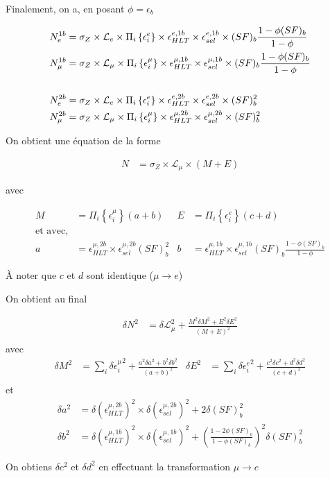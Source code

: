 \documentclass[a4paper,11pt]{article}
\begin{document}
Finalement, on a, en posant $\phi = \epsilon_b$

\begin{align}
  N_e^{1b} &= \sigma_Z \times \mathcal{L}_e \times \Pi_i \left\{ \epsilon_i^{e} \right\} \times \epsilon_{HLT}^{e, 1b} \times \epsilon_{sel}^{e, 1b} \times (SF)_b\frac{1 - \phi (SF)_b}{1 - \phi} \\
  N_\mu^{1b} &= \sigma_Z \times \mathcal{L}_\mu \times \Pi_i \left\{ \epsilon_i^{\mu} \right\} \times \epsilon_{HLT}^{\mu, 1b} \times \epsilon_{sel}^{\mu, 1b} \times (SF)_b\frac{1 - \phi (SF)_b}{1 - \phi} \\
  \notag \\
  N_e^{2b} &= \sigma_Z \times \mathcal{L}_e \times \Pi_i \left\{ \epsilon_i^{e} \right\} \times \epsilon_{HLT}^{e, 2b} \times \epsilon_{sel}^{e, 2b} \times (SF)_b^2 \\
  N_\mu^{2b} &= \sigma_Z \times \mathcal{L}_\mu \times \Pi_i \left\{ \epsilon_i^{\mu} \right\} \times \epsilon_{HLT}^{\mu, 2b} \times \epsilon_{sel}^{\mu, 2b} \times (SF)_b^2
\end{align}

On obtient une équation de la forme

\begin{align}
  N &= \sigma_Z \times \mathcal{L}_\mu \times \left( M + E \right)
\end{align}

avec

\begin{align}
  M &= \Pi_i \left\{ \epsilon_i^{\mu} \right\} \left( a + b \right) & 
  E &= \Pi_i \left\{ \epsilon_i^{e} \right\} \left( c + d \right) \\
  \text{et avec,} \\
  a &= \epsilon_{HLT}^{\mu, 2b} \times \epsilon_{sel}^{\mu, 2b} (SF)_b^2 & b &= \epsilon_{HLT}^{\mu, 1b} \times \epsilon_{sel}^{\mu, 1b} (SF)_b\frac{1 - \phi (SF)_b}{1 - \phi}
\end{align}

À noter que $c$ et $d$ sont identique ($\mu \rightarrow e$)

On obtient au final

\begin{align}
  \delta N^2 &= \delta \mathcal{L}_\mu^2 + \frac{M^2 \delta M^2 + E^2 \delta E^2}{\left(M + E\right)^2}\\
\end{align}
avec 
\begin{align}
  \delta M^2 &= \sum_i{\delta {\epsilon_i^{\mu}}^2} + \frac{a^2 \delta a^2 + b^2 \delta b^2}{\left(a + b\right)^2} &
  \delta E^2 &= \sum_i{\delta {\epsilon_i^{e}}^2} + \frac{c^2 \delta c^2 + d^2 \delta d^2}{\left(c + d\right)^2} \\
\end{align}
et
\begin{align}
  \delta a^2 &= \delta \left( \epsilon_{HLT}^{\mu, 2b} \right)^2 \times \delta \left( \epsilon_{sel}^{\mu, 2b} \right)^2 + 2\delta(SF)_b^2\\
  \delta b^2 &= \delta \left( \epsilon_{HLT}^{\mu, 1b} \right)^2 \times \delta \left( \epsilon_{sel}^{\mu, 1b} \right)^2 + \left( \frac{1 - 2\phi (SF)_b}{1 - \phi (SF)_b} \right)^2 \delta(SF)_b^2
\end{align}

On obtiens $\delta c^2$ et $\delta d^2$ en effectuant la transformation $\mu \rightarrow e$
\end{document}
